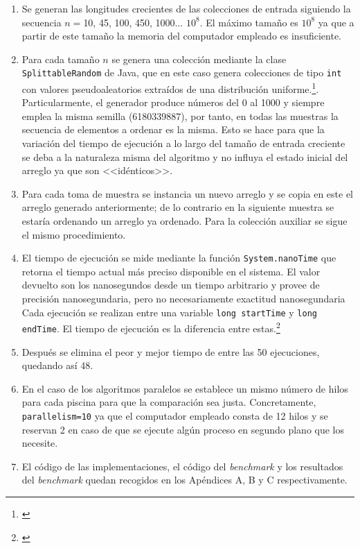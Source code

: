 \documentclass[titlepage]{article}
\begin{document}
\begin{enumerate}
	\item Se generan las longitudes crecientes de las colecciones de entrada siguiendo la secuencia $n=$10, 45, 100, 450, 1000... $10^8$. El máximo tamaño es $10^8$ ya que a partir de este tamaño la memoria del computador empleado es insuficiente.
	\item Para cada tamaño $n$ se genera una colección mediante la clase \lstinline{SplittableRandom} de Java, que en este caso genera colecciones de tipo \lstinline{int} con valores pseudoaleatorios extraídos de una distribución uniforme.\footnote{\cite{OracleSplittableRandom}}. Particularmente, el generador produce números del 0 al 1000 y siempre emplea la misma semilla (6180339887), por tanto, en todas las muestras la secuencia de elementos a ordenar es la misma. Esto se hace para que la variación del tiempo de ejecución a lo largo del tamaño de entrada creciente se deba a la naturaleza misma del algoritmo y no influya el estado inicial del arreglo ya que son <<idénticos>>.
	\item Para cada toma de muestra se instancia un nuevo arreglo y se copia en este el arreglo generado anteriormente; de lo contrario en la siguiente muestra se estaría ordenando un arreglo ya ordenado. Para la colección auxiliar se sigue el mismo procedimiento.
	\item El tiempo de ejecución se mide mediante la función \lstinline{System.nanoTime} que retorna el tiempo actual más preciso disponible en el sistema. El valor devuelto son los nanosegundos desde un tiempo arbitrario y provee de precisión nanosegundaria, pero no necesariamente exactitud nanosegundaria Cada ejecución se realizan entre una variable \lstinline{long startTime} y \lstinline{long endTime}. El tiempo de ejecución es la diferencia entre estas.\footnote{\cite{OracleSystem}}
	\item Después se elimina el peor y mejor tiempo de entre las 50 ejecuciones, quedando así 48.
	\item En el caso de los algoritmos paralelos se establece un mismo número de hilos para cada piscina para que la comparación sea justa. Concretamente, \lstinline{parallelism=10} ya que el computador empleado consta de 12 hilos y se reservan 2 en caso de que se ejecute algún proceso en segundo plano que los necesite. 
	\item El código de las implementaciones, el código del \textit{benchmark} y los resultados del \textit{benchmark} quedan recogidos en los Apéndices A, B y C respectivamente.
	
\end{enumerate}
\end{document}
